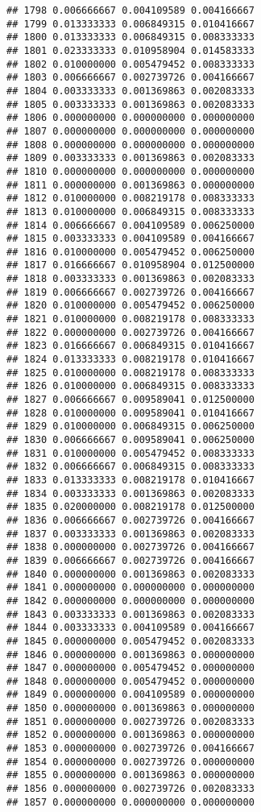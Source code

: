 \documentclass[
]{article}
\begin{document}
\begin{verbatim}
## 1798 0.006666667 0.004109589 0.004166667
## 1799 0.013333333 0.006849315 0.010416667
## 1800 0.013333333 0.006849315 0.008333333
## 1801 0.023333333 0.010958904 0.014583333
## 1802 0.010000000 0.005479452 0.008333333
## 1803 0.006666667 0.002739726 0.004166667
## 1804 0.003333333 0.001369863 0.002083333
## 1805 0.003333333 0.001369863 0.002083333
## 1806 0.000000000 0.000000000 0.000000000
## 1807 0.000000000 0.000000000 0.000000000
## 1808 0.000000000 0.000000000 0.000000000
## 1809 0.003333333 0.001369863 0.002083333
## 1810 0.000000000 0.000000000 0.000000000
## 1811 0.000000000 0.001369863 0.000000000
## 1812 0.010000000 0.008219178 0.008333333
## 1813 0.010000000 0.006849315 0.008333333
## 1814 0.006666667 0.004109589 0.006250000
## 1815 0.003333333 0.004109589 0.004166667
## 1816 0.010000000 0.005479452 0.006250000
## 1817 0.016666667 0.010958904 0.012500000
## 1818 0.003333333 0.001369863 0.002083333
## 1819 0.006666667 0.002739726 0.004166667
## 1820 0.010000000 0.005479452 0.006250000
## 1821 0.010000000 0.008219178 0.008333333
## 1822 0.000000000 0.002739726 0.004166667
## 1823 0.016666667 0.006849315 0.010416667
## 1824 0.013333333 0.008219178 0.010416667
## 1825 0.010000000 0.008219178 0.008333333
## 1826 0.010000000 0.006849315 0.008333333
## 1827 0.006666667 0.009589041 0.012500000
## 1828 0.010000000 0.009589041 0.010416667
## 1829 0.010000000 0.006849315 0.006250000
## 1830 0.006666667 0.009589041 0.006250000
## 1831 0.010000000 0.005479452 0.008333333
## 1832 0.006666667 0.006849315 0.008333333
## 1833 0.013333333 0.008219178 0.010416667
## 1834 0.003333333 0.001369863 0.002083333
## 1835 0.020000000 0.008219178 0.012500000
## 1836 0.006666667 0.002739726 0.004166667
## 1837 0.003333333 0.001369863 0.002083333
## 1838 0.000000000 0.002739726 0.004166667
## 1839 0.006666667 0.002739726 0.004166667
## 1840 0.000000000 0.001369863 0.002083333
## 1841 0.000000000 0.000000000 0.000000000
## 1842 0.000000000 0.000000000 0.000000000
## 1843 0.003333333 0.001369863 0.002083333
## 1844 0.003333333 0.004109589 0.004166667
## 1845 0.000000000 0.005479452 0.002083333
## 1846 0.000000000 0.001369863 0.000000000
## 1847 0.000000000 0.005479452 0.000000000
## 1848 0.000000000 0.005479452 0.000000000
## 1849 0.000000000 0.004109589 0.000000000
## 1850 0.000000000 0.001369863 0.000000000
## 1851 0.000000000 0.002739726 0.002083333
## 1852 0.000000000 0.001369863 0.000000000
## 1853 0.000000000 0.002739726 0.004166667
## 1854 0.000000000 0.002739726 0.000000000
## 1855 0.000000000 0.001369863 0.000000000
## 1856 0.000000000 0.002739726 0.002083333
## 1857 0.000000000 0.000000000 0.000000000

\end{verbatim}
\end{document}
